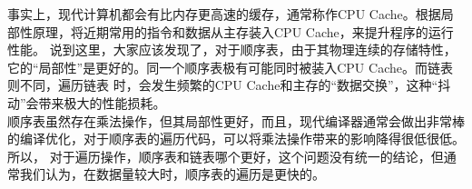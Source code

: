 \begin{insightbox}
    事实上，现代计算机都会有比内存更高速的缓存，通常称作CPU Cache。根据局部性原理，将近期常用的指令和数据从主存装入CPU Cache，来提升程序的运行性能。
    说到这里，大家应该发现了，对于顺序表，由于其物理连续的存储特性，它的“局部性”是更好的。同一个顺序表极有可能同时被装入CPU Cache。而链表则不同，遍历链表
    时，会发生频繁的CPU Cache和主存的“数据交换”，这种“抖动”会带来极大的性能损耗。\\

        顺序表虽然存在乘法操作，但其局部性更好，而且，现代编译器通常会做出非常棒的编译优化，对于顺序表的遍历代码，可以将乘法操作带来的影响降得很低很低。所以，
    对于遍历操作，顺序表和链表哪个更好，这个问题没有统一的结论，但通常我们认为，在数据量较大时，顺序表的遍历是更快的。
\end{insightbox}


\clearpage%
